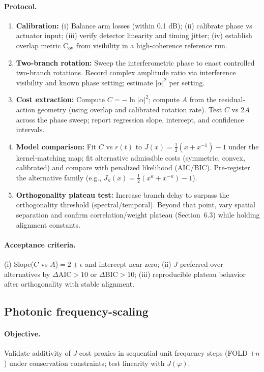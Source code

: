 \documentclass[12pt,a4paper]{article}
\begin{document}
\paragraph{Protocol.}
\begin{enumerate}
  \item \textbf{Calibration:} (i) Balance arm losses (within 0.1 dB); (ii) calibrate phase vs actuator input; (iii) verify detector linearity and timing jitter; (iv) establish overlap metric $\mathrm{C}_{\mathrm{ov}}$ from visibility in a high-coherence reference run.
  \item \textbf{Two-branch rotation:} Sweep the interferometric phase to enact controlled two-branch rotations. Record complex amplitude ratio via interference visibility and known phase setting; estimate $|\alpha|^{2}$ per setting.
  \item \textbf{Cost extraction:} Compute $C=-\ln |\alpha|^{2}$; compute $A$ from the residual-action geometry (using overlap and calibrated rotation rate). Test $C$ vs $2A$ across the phase sweep; report regression slope, intercept, and confidence intervals.
  \item \textbf{Model comparison:} Fit $C$ vs $r(t)$ to $J(x)=\tfrac{1}{2}(x+x^{-1})-1$ under the kernel-matching map; fit alternative admissible costs (symmetric, convex, calibrated) and compare with penalized likelihood (AIC/BIC). Pre-register the alternative family (e.g., $J_\kappa(x)=\tfrac{1}{2}(x^{\kappa}+x^{-\kappa})-1$).
  \item \textbf{Orthogonality plateau test:} Increase branch delay to surpass the orthogonality threshold (spectral/temporal). Beyond that point, vary spatial separation and confirm correlation/weight plateau (Section~6.3) while holding alignment constants.
\end{enumerate}

\paragraph{Acceptance criteria.}
(i) Slope($C$ vs $A$)$=2\pm\epsilon$ and intercept near zero; (ii) $J$ preferred over alternatives by $\Delta\mathrm{AIC}\!>\!10$ or $\Delta\mathrm{BIC}\!>\!10$; (iii) reproducible plateau behavior after orthogonality with stable alignment.

\subsection{Photonic frequency-scaling}
\paragraph{Objective.}
Validate additivity of $J$-cost proxies in sequential unit frequency steps (FOLD $+n$) under conservation constraints; test linearity with $J(\varphi)$.
\end{document}
